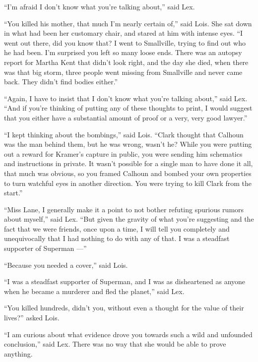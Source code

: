 ``I'm afraid I don't know what you're talking about,'' said Lex.

``You killed his mother, that much I'm nearly certain of,'' said Lois.
She sat down in what had been her customary chair, and stared at him
with intense eyes. ``I went out there, did you know that? I went to
Smallville, trying to find out who he had been. I'm surprised you left
so many loose ends. There was an autopsy report for Martha Kent that
didn't look right, and the day she died, when there was that big storm,
three people went missing from Smallville and never came back. They
didn't find bodies either.''

``Again, I have to insist that I don't know what you're talking about,''
said Lex. ``And if you're thinking of putting any of these thoughts to
print, I would suggest that you either have a substantial amount of
proof or a very, very good lawyer.''

``I kept thinking about the bombings,'' said Lois. ``Clark thought that
Calhoun was the man behind them, but he was wrong, wasn't he? While you
were putting out a reward for Kramer's capture in public, you were
sending him schematics and instructions in private. It wasn't possible
for a single man to have done it all, that much was obvious, so you
framed Calhoun and bombed your own properties to turn watchful eyes in
another direction. You were trying to kill Clark from the start.''

``Miss Lane, I generally make it a point to not bother refuting spurious
rumors about myself,'' said Lex. ``But given the gravity of what you're
suggesting and the fact that we were friends, once upon a time, I will
tell you completely and unequivocally that I had nothing to do with any
of that. I was a steadfast supporter of Superman ---''

``Because you needed a cover,'' said Lois.

``I was a steadfast supporter of Superman, and I was as disheartened as
anyone when he became a murderer and fled the planet,'' said Lex.

``You killed hundreds, didn't you, without even a thought for the value
of their lives?'' asked Lois.

``I am curious about what evidence drove you towards such a wild and
unfounded conclusion,'' said Lex. There was no way that she would be
able to prove anything.

